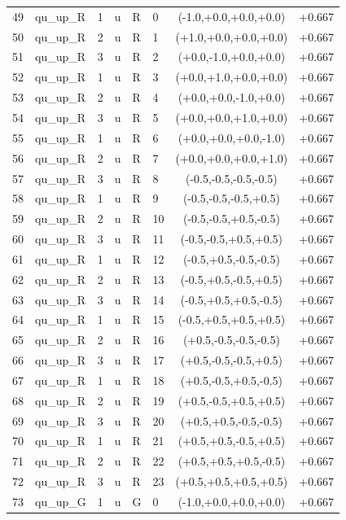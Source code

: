 \begin{longtable}{rlllllcl}
49 & qu\_up\_R & 1 & u & R & 0 & (-1.0,+0.0,+0.0,+0.0) & +0.667 \\
50 & qu\_up\_R & 2 & u & R & 1 & (+1.0,+0.0,+0.0,+0.0) & +0.667 \\
51 & qu\_up\_R & 3 & u & R & 2 & (+0.0,-1.0,+0.0,+0.0) & +0.667 \\
52 & qu\_up\_R & 1 & u & R & 3 & (+0.0,+1.0,+0.0,+0.0) & +0.667 \\
53 & qu\_up\_R & 2 & u & R & 4 & (+0.0,+0.0,-1.0,+0.0) & +0.667 \\
54 & qu\_up\_R & 3 & u & R & 5 & (+0.0,+0.0,+1.0,+0.0) & +0.667 \\
55 & qu\_up\_R & 1 & u & R & 6 & (+0.0,+0.0,+0.0,-1.0) & +0.667 \\
56 & qu\_up\_R & 2 & u & R & 7 & (+0.0,+0.0,+0.0,+1.0) & +0.667 \\
57 & qu\_up\_R & 3 & u & R & 8 & (-0.5,-0.5,-0.5,-0.5) & +0.667 \\
58 & qu\_up\_R & 1 & u & R & 9 & (-0.5,-0.5,-0.5,+0.5) & +0.667 \\
59 & qu\_up\_R & 2 & u & R & 10 & (-0.5,-0.5,+0.5,-0.5) & +0.667 \\
60 & qu\_up\_R & 3 & u & R & 11 & (-0.5,-0.5,+0.5,+0.5) & +0.667 \\
61 & qu\_up\_R & 1 & u & R & 12 & (-0.5,+0.5,-0.5,-0.5) & +0.667 \\
62 & qu\_up\_R & 2 & u & R & 13 & (-0.5,+0.5,-0.5,+0.5) & +0.667 \\
63 & qu\_up\_R & 3 & u & R & 14 & (-0.5,+0.5,+0.5,-0.5) & +0.667 \\
64 & qu\_up\_R & 1 & u & R & 15 & (-0.5,+0.5,+0.5,+0.5) & +0.667 \\
65 & qu\_up\_R & 2 & u & R & 16 & (+0.5,-0.5,-0.5,-0.5) & +0.667 \\
66 & qu\_up\_R & 3 & u & R & 17 & (+0.5,-0.5,-0.5,+0.5) & +0.667 \\
67 & qu\_up\_R & 1 & u & R & 18 & (+0.5,-0.5,+0.5,-0.5) & +0.667 \\
68 & qu\_up\_R & 2 & u & R & 19 & (+0.5,-0.5,+0.5,+0.5) & +0.667 \\
69 & qu\_up\_R & 3 & u & R & 20 & (+0.5,+0.5,-0.5,-0.5) & +0.667 \\
70 & qu\_up\_R & 1 & u & R & 21 & (+0.5,+0.5,-0.5,+0.5) & +0.667 \\
71 & qu\_up\_R & 2 & u & R & 22 & (+0.5,+0.5,+0.5,-0.5) & +0.667 \\
72 & qu\_up\_R & 3 & u & R & 23 & (+0.5,+0.5,+0.5,+0.5) & +0.667 \\
73 & qu\_up\_G & 1 & u & G & 0 & (-1.0,+0.0,+0.0,+0.0) & +0.667 \\

\end{longtable}
